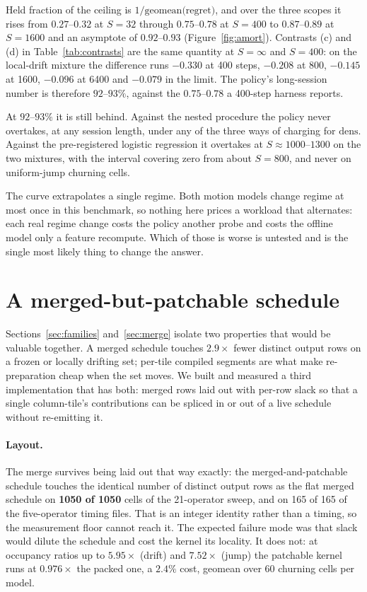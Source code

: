 \documentclass{article}
\begin{document}
Held fraction of the ceiling is $1/\text{geomean(regret)}$, and over the three
scopes it rises from $0.27$--$0.32$ at $S{=}32$ through $0.75$--$0.78$ at
$S{=}400$ to $0.87$--$0.89$ at $S{=}1600$ and an asymptote of $0.92$--$0.93$
(Figure~\ref{fig:amort}). Contrasts (c) and (d) in
Table~\ref{tab:contrasts} are the same quantity at $S{=}\infty$ and $S{=}400$:
on the local-drift mixture the difference runs $-0.330$ at 400 steps, $-0.208$
at 800, $-0.145$ at 1600, $-0.096$ at 6400 and $-0.079$ in the limit. The
policy's long-session number is therefore $92$--$93\%$, against the
$0.75$--$0.78$ a 400-step harness reports.

At $92$--$93\%$ it is still behind. Against the nested procedure the policy never
overtakes, at any session length, under any of the three ways of charging for
$\mathrm{dens}$. Against the pre-registered logistic regression it overtakes at
$S \approx 1000$--$1300$ on the two mixtures, with the interval covering zero
from about $S{=}800$, and never on uniform-jump churning cells.

The curve extrapolates a single regime. Both motion models change regime at most
once in this benchmark, so nothing here prices a workload that alternates: each
real regime change costs the policy another probe and costs the offline model
only a feature recompute. Which of those is worse is untested and is the single
most likely thing to change the answer.

\section{A merged-but-patchable schedule}
\label{sec:patch}

Sections~\ref{sec:families} and~\ref{sec:merge} isolate two properties that
would be valuable together. A merged schedule touches $2.9\times$ fewer distinct
output rows on a frozen or locally drifting set; per-tile compiled segments are
what make re-preparation cheap when the set moves. We built and measured a third
implementation that has both: merged rows laid out with per-row slack so that a
single column-tile's contributions can be spliced in or out of a live schedule
without re-emitting it.

\paragraph{Layout.}
The merge survives being laid out that way exactly: the merged-and-patchable
schedule touches the identical number of distinct output rows as the flat merged
schedule on \textbf{1050 of 1050} cells of the 21-operator sweep, and on 165 of
165 of the five-operator timing files. That is an integer identity
rather than a timing, so the measurement floor cannot reach it. The expected
failure mode was that slack would dilute the schedule and
cost the kernel its locality. It does not: at occupancy ratios up to $5.95\times$
(drift) and $7.52\times$ (jump) the patchable kernel runs at $0.976\times$ the
packed one, a $2.4\%$ cost, geomean over 60 churning cells per model.
\end{document}
